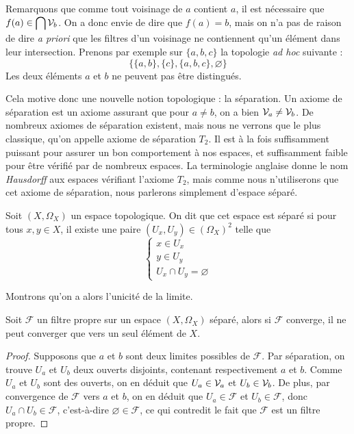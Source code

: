 Remarquons que comme tout voisinage de $a$ contient $a$, il est nécessaire que
$\displaystyle f(a)\in\bigcap\mathcal{V}_b$. On a donc envie de dire que $f(a)=b$,
mais on n'a pas de raison de dire \textit{a priori} que les filtres d'un
voisinage ne contiennent qu'un élément dans leur intersection. Prenons par
exemple sur $\{a,b,c\}$ la topologie \textit{ad hoc} suivante :
\[\{\{a,b\},\{c\},\{a,b,c\},\varnothing\}\]
Les deux éléments $a$ et $b$ ne peuvent pas être distingués.

Cela motive donc une nouvelle notion topologique : la séparation. Un axiome de
séparation est un axiome assurant que pour $a\neq b$, on a bien
$\mathcal{V}_a\neq\mathcal{V}_b$. De nombreux axiomes de séparation existent, mais nous ne
verrons que le plus classique, qu'on appelle axiome de séparation $T_2$. Il est
à la fois suffisamment puissant pour assurer un bon comportement à nos espaces,
et suffisamment faible pour être vérifié par de nombreux espaces. La
terminologie anglaise donne le nom \textit{Hausdorff} aux espaces vérifiant
l'axiome $T_2$, mais comme nous n'utiliserons que cet axiome de séparation, nous
parlerons simplement d'espace séparé.

\begin{definition}
  Soit $(X,\Omega_X)$ un espace topologique. On dit que cet espace est séparé
  si pour tous $x,y\in X$, il existe une paire $(U_x,U_y)\in (\Omega_X)^2$ telle
  que
  \[\begin{cases}
  x\in U_x\\
  y\in U_y\\
  U_x\cap U_y = \varnothing
  \end{cases}\]
\end{definition}

Montrons qu'on a alors l'unicité de la limite.

\begin{proposition}
  Soit $\mathcal F$ un filtre propre sur un espace $(X,\Omega_X)$ séparé, alors
  si $\mathcal F$ converge, il ne peut converger que vers un seul élément de
  $X$.
\end{proposition}

\begin{proof}
  Supposons que $a$ et $b$ sont deux limites possibles de $\mathcal F$. Par
  séparation, on trouve $U_a$ et $U_b$ deux ouverts disjoints, contenant
  respectivement $a$ et $b$. Comme $U_a$ et $U_b$ sont des ouverts, on en déduit
  que $U_a\in\mathcal{V}_a$ et $U_b\in\mathcal{V}_b$. De plus, par convergence de
  $\mathcal F$ vers $a$ et $b$, on en déduit que $U_a\in\mathcal F$ et
  $U_b\in\mathcal F$, donc $U_a\cap U_b\in\mathcal F$, c'est-à-dire
  $\varnothing\in\mathcal F$, ce qui contredit le fait que $\mathcal F$ est
  un filtre propre.
\end{proof}

